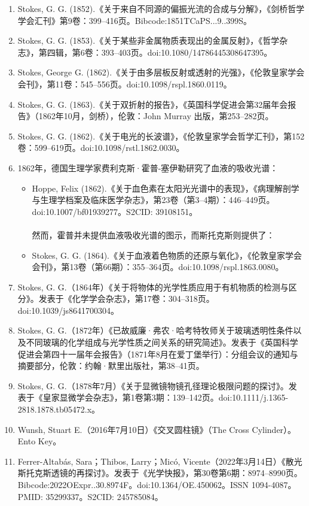 \begin{enumerate}
\item Stokes, G. G. (1852).《关于来自不同源的偏振光流的合成与分解》，《剑桥哲学学会汇刊》第9卷：399–416页。Bibcode:1851TCaPS...9..399S。
\item Stokes, G. G. (1853).《关于某些非金属物质表现出的金属反射》，《哲学杂志》，第四辑，第6卷：393–403页。doi:10.1080/14786445308647395。
\item Stokes, George G. (1862).《关于由多层板反射或透射的光强》，《伦敦皇家学会会刊》，第11卷：545–556页。doi:10.1098/rspl.1860.0119。
\item Stokes, G. G. (1863).《关于双折射的报告》，《英国科学促进会第32届年会报告》（1862年10月，剑桥），伦敦：John Murray 出版，第253–282页。
\item Stokes, G. G. (1862).《关于电光的长波谱》，《伦敦皇家学会哲学汇刊》，第152卷：599–619页。doi:10.1098/rstl.1862.0030。
\item 1862年，德国生理学家费利克斯·霍普-塞伊勒研究了血液的吸收光谱：
\begin{itemize}
\item Hoppe, Felix (1862).《关于血色素在太阳光光谱中的表现》，《病理解剖学与生理学档案及临床医学杂志》，第23卷（第3–4期）：446–449页。doi:10.1007/bf01939277。S2CID: 39108151。\\\\
然而，霍普并未提供血液吸收光谱的图示，而斯托克斯则提供了：
\item Stokes, G. G. (1864).《关于血液着色物质的还原与氧化》，《伦敦皇家学会会刊》，第13卷（第66期）：355–364页。doi:10.1098/rspl.1863.0080。
\end{itemize}
\item Stokes, G. G.（1864年）《关于将物体的光学性质应用于有机物质的检测与区分》。发表于《化学学会杂志》，第17卷：304–318页。doi:10.1039/js8641700304。
\item Stokes, G. G.（1872年）《已故威廉·弗农·哈考特牧师关于玻璃透明性条件以及不同玻璃的化学组成与光学性质之间关系的研究简述》。发表于《英国科学促进会第四十一届年会报告》（1871年8月在爱丁堡举行）：分组会议的通知与摘要部分，伦敦：约翰·默里出版社，第38–41页。
\item Stokes, G. G.（1878年7月）《关于显微镜物镜孔径理论极限问题的探讨》。发表于《皇家显微学会杂志》，第1卷第3期：139–142页。doi:10.1111/j.1365-2818.1878.tb05472.x。
\item Wunsh, Stuart E.（2016年7月10日）《交叉圆柱镜》（The Cross Cylinder）。Ento Key。
\item Ferrer-Altabás, Sara；Thibos, Larry；Micó, Vicente（2022年3月14日）《散光斯托克斯透镜的再探讨》。发表于《光学快报》，第30卷第6期：8974–8990页。Bibcode:2022OExpr..30.8974F。doi:10.1364/OE.450062。ISSN 1094-4087。PMID: 35299337。S2CID: 245785084。

\end{enumerate}
